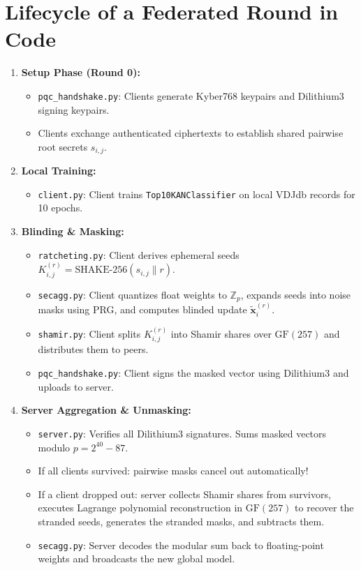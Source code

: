 \documentclass[11pt,a4paper]{report}
\begin{document}
\section{Lifecycle of a Federated Round in Code}
\begin{enumerate}[itemsep=3pt]
  \item \textbf{Setup Phase (Round 0):}
  \begin{itemize}[itemsep=1pt]
    \item \lstinline|pqc_handshake.py|: Clients generate Kyber768 keypairs and Dilithium3 signing keypairs.
    \item Clients exchange authenticated ciphertexts to establish shared pairwise root secrets $s_{i,j}$.
  \end{itemize}
  \item \textbf{Local Training:}
  \begin{itemize}[itemsep=1pt]
    \item \lstinline|client.py|: Client trains \lstinline|Top10KANClassifier| on local VDJdb records for 10 epochs.
  \end{itemize}
  \item \textbf{Blinding & Masking:}
  \begin{itemize}[itemsep=1pt]
    \item \lstinline|ratcheting.py|: Client derives ephemeral seeds $K_{i,j}^{(r)} = \text{SHAKE-256}(s_{i,j} \parallel r)$.
    \item \lstinline|secagg.py|: Client quantizes float weights to $\mathbb{Z}_p$, expands seeds into noise masks using PRG, and computes blinded update $\widetilde{\mathbf{x}}_i^{(r)}$.
    \item \lstinline|shamir.py|: Client splits $K_{i,j}^{(r)}$ into Shamir shares over $\text{GF}(257)$ and distributes them to peers.
    \item \lstinline|pqc_handshake.py|: Client signs the masked vector using Dilithium3 and uploads to server.
  \end{itemize}
  \item \textbf{Server Aggregation & Unmasking:}
  \begin{itemize}[itemsep=1pt]
    \item \lstinline|server.py|: Verifies all Dilithium3 signatures. Sums masked vectors modulo $p = 2^{40}-87$.
    \item If all clients survived: pairwise masks cancel out automatically!
    \item If a client dropped out: server collects Shamir shares from survivors, executes Lagrange polynomial reconstruction in $\text{GF}(257)$ to recover the stranded seeds, generates the stranded masks, and subtracts them.
    \item \lstinline|secagg.py|: Server decodes the modular sum back to floating-point weights and broadcasts the new global model.
  \end{itemize}
\end{enumerate}
\end{document}
